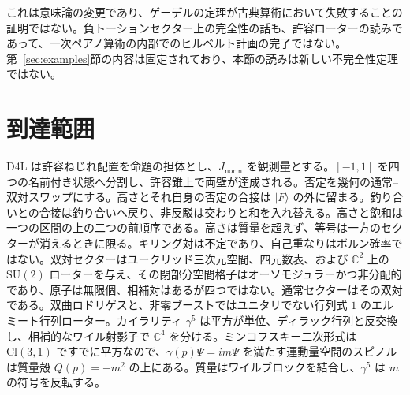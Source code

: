 \documentclass[a4paper]{article}
\theoremstyle{definition}
\newcommand{\Jnorm}{J_{\mathrm{norm}}}
\begin{document}
これは意味論の変更であり、ゲーデルの定理が古典算術において失敗することの証明ではない。負トーションセクター上の完全性の話も、許容ローターの読みであって、一次ペアノ算術の内部でのヒルベルト計画の完了ではない。第~\ref{sec:examples}節の内容は固定されており、本節の読みは新しい不完全性定理ではない。

\section{到達範囲}
\label{sec:claims}

D4L は許容ねじれ配置を命題の担体とし、\(\Jnorm\) を観測量とする。\([-1,1]\) を四つの名前付き状態へ分割し、許容錐上で両壁が達成される。否定を幾何の通常–双対スワップにする。高さとそれ自身の否定の合接は \(\lvert F\rangle\) の外に留まる。釣り合いとの合接は釣り合いへ戻り、非反駁は交わりと和を入れ替える。高さと飽和は一つの区間の上の二つの前順序である。高さは質量を超えず、等号は一方のセクターが消えるときに限る。キリング対は不定であり、自己重なりはボルン確率ではない。双対セクターはユークリッド三次元空間、四元数表、および \(\mathbb{C}^2\) 上の \(\mathrm{SU}(2)\) ローターを与え、その閉部分空間格子はオーソモジュラーかつ非分配的であり、原子は無限個、相補対はあるが四つではない。通常セクターはその双対である。双曲ロドリゲスと、非零ブーストではユニタリでない行列式 \(1\) のエルミート行列ローター。カイラリティ \(\gamma^5\) は平方が単位、ディラック行列と反交換し、相補的なワイル射影子で \(\mathbb{C}^4\) を分ける。ミンコフスキー二次形式は \(\mathrm{Cl}(3,1)\) ですでに平方なので、\(\gamma(p)\Psi=im\Psi\) を満たす運動量空間のスピノルは質量殻 \(Q(p)=-m^2\) の上にある。質量はワイルブロックを結合し、\(\gamma^5\) は \(m\) の符号を反転する。
\end{document}
